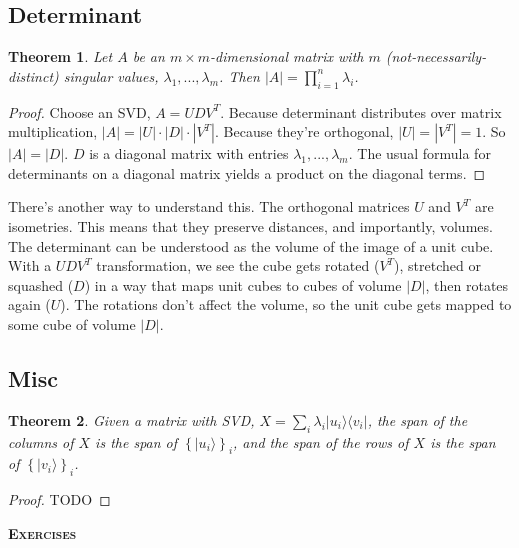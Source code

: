 \documentclass{amsbook}
\newtheorem{theorem}{Theorem}
\begin{document}
\subsection{Determinant}

 \begin{theorem}
  \label{DeterminantTheorem}
Let $A$ be an $m\times m$-dimensional matrix with $m$ (not-necessarily-distinct) singular values, $\lambda_1, ..., \lambda_m$.  Then $|A|=\prod_{i=1}^n\lambda_i$.
 \end{theorem}

\begin{proof}
Choose an SVD, $A=UDV^T$.  Because determinant distributes over matrix multiplication, $|A|=|U|\cdot|D|\cdot|V^T|$.  Because they're orthogonal, $|U|=|V^T|=1$.  So $|A|=|D|$.  $D$ is a diagonal matrix with entries $\lambda_1, ..., \lambda_m$.  The usual formula for determinants on a diagonal matrix yields a product on the diagonal terms.
\end{proof}

There's another way to understand this.  The orthogonal matrices $U$ and $V^T$ are isometries.  This means that they preserve distances, and importantly, volumes.  The determinant can be understood as the volume of the image of a unit cube.  With a $UDV^T$ transformation, we see the cube gets rotated ($V^T$), stretched or squashed ($D$) in a way that maps unit cubes to cubes of volume $|D|$, then rotates again ($U$).  The rotations don't affect the volume, so the unit cube gets mapped to some cube of volume $|D|$.

\subsection{Misc}

\begin{theorem}
\label{ColumnAndRowSpace}
Given a matrix with SVD, $X=\sum_i\lambda_i|u_i\rangle\langle v_i|$, the span of the columns of $X$ is the span of $\left\{|u_i\rangle\right\}_i$, and the span of the rows of $X$ is the span of $\left\{|v_i\rangle\right\}_i$.
\end{theorem}

\begin{proof}
  TODO
\end{proof}

{\bfseries\scshape\Large Exercises}
\end{document}
